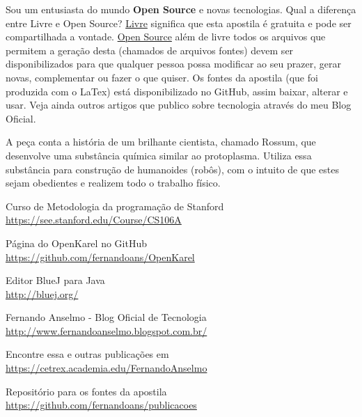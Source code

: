 \documentclass[a4paper,11pt]{article}
\begin{document}
Sou um entusiasta do mundo \textbf{Open Source} e novas tecnologias. Qual a diferença entre Livre e Open Source? \underline{Livre} significa que esta apostila é gratuita e pode ser compartilhada a vontade. \underline{Open Source} além de livre todos os arquivos que permitem a geração desta (chamados de arquivos fontes) devem ser disponibilizados para que qualquer pessoa possa modificar ao seu prazer, gerar novas, complementar ou fazer o que quiser. Os fontes da apostila (que foi produzida com o LaTex) está disponibilizado no GitHub\cite{github}, assim baixar, alterar e usar. Veja ainda outros artigos que publico sobre tecnologia através do meu Blog Oficial\cite{fernandoanselmo}.

\begin{thebibliography}{7}
  A peça conta a história de um brilhante cientista, chamado Rossum, que desenvolve uma substância química similar ao protoplasma. Utiliza essa substância para construção de humanoides (robôs), com o intuito de que estes sejam obedientes e realizem todo o trabalho físico.

  Curso de Metodologia da programação de Stanford \\
  \url{https://see.stanford.edu/Course/CS106A}
  
  Página do OpenKarel no GitHub \\
  \url{https://github.com/fernandoans/OpenKarel}
  
  Editor BlueJ para Java \\
  \url{http://bluej.org/}

  Fernando Anselmo - Blog Oficial de Tecnologia \\
  \url{http://www.fernandoanselmo.blogspot.com.br/}
  
  Encontre essa e outras publicações em \\
  \url{https://cetrex.academia.edu/FernandoAnselmo}

  Repositório para os fontes da apostila \\
  \url{https://github.com/fernandoans/publicacoes}
\end{thebibliography}
  
\end{document}
